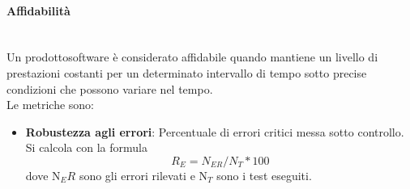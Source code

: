 	\paragraph{Affidabilità} \mbox{}\\
	Un prodotto\glosp software è considerato affidabile quando mantiene un livello di prestazioni costanti per un determinato intervallo di tempo sotto precise condizioni che possono variare nel tempo.\\
	Le metriche sono:
	\begin{itemize}
		\item \textbf{Robustezza agli errori}: Percentuale di errori critici messa sotto controllo. Si calcola con la formula
		\[R_E=N_{ER}/N_{T}*100\]
		dove N$_ER$ sono gli errori rilevati e N$_T$ sono i test eseguiti.
	\end{itemize}
